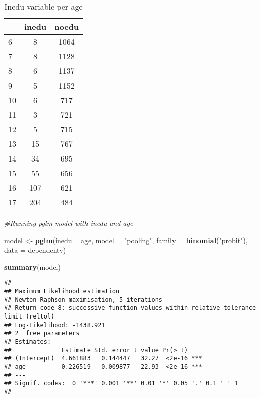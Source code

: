 \documentclass[
]{article}
\newenvironment{Shaded}{\begin{snugshade}}{\end{snugshade}}
\newcommand{\CommentTok}[1]{\textcolor[rgb]{0.56,0.35,0.01}{\textit{#1}}}
\newcommand{\DataTypeTok}[1]{\textcolor[rgb]{0.13,0.29,0.53}{#1}}
\newcommand{\KeywordTok}[1]{\textcolor[rgb]{0.13,0.29,0.53}{\textbf{#1}}}
\newcommand{\NormalTok}[1]{#1}
\newcommand{\OperatorTok}[1]{\textcolor[rgb]{0.81,0.36,0.00}{\textbf{#1}}}
\newcommand{\StringTok}[1]{\textcolor[rgb]{0.31,0.60,0.02}{#1}}
\begin{document}
\begin{table}

\caption{\label{tab:unnamed-chunk-9}Inedu variable per age}
\centering
\begin{tabular}[t]{l|c|c}
\hline
  & inedu & noedu\\
\hline
6 & 8 & 1064\\
\hline
7 & 8 & 1128\\
\hline
8 & 6 & 1137\\
\hline
9 & 5 & 1152\\
\hline
10 & 6 & 717\\
\hline
11 & 3 & 721\\
\hline
12 & 5 & 715\\
\hline
13 & 15 & 767\\
\hline
14 & 34 & 695\\
\hline
15 & 55 & 656\\
\hline
16 & 107 & 621\\
\hline
17 & 204 & 484\\
\hline
\end{tabular}
\end{table}

\begin{Shaded}
\begin{Highlighting}[]
\CommentTok{#Running pglm model with inedu and age }


\NormalTok{model <-}\StringTok{ }\KeywordTok{pglm}\NormalTok{(inedu }\OperatorTok{~}\StringTok{ }\NormalTok{age, }\DataTypeTok{model =} \StringTok{"pooling"}\NormalTok{, }\DataTypeTok{family =} \KeywordTok{binomial}\NormalTok{(}\StringTok{"probit"}\NormalTok{), }\DataTypeTok{data =}\NormalTok{ dependentv)}

\KeywordTok{summary}\NormalTok{(model)}
\end{Highlighting}
\end{Shaded}

\begin{verbatim}
## --------------------------------------------
## Maximum Likelihood estimation
## Newton-Raphson maximisation, 5 iterations
## Return code 8: successive function values within relative tolerance limit (reltol)
## Log-Likelihood: -1438.921 
## 2  free parameters
## Estimates:
##              Estimate Std. error t value Pr(> t)    
## (Intercept)  4.661883   0.144447   32.27  <2e-16 ***
## age         -0.226519   0.009877  -22.93  <2e-16 ***
## ---
## Signif. codes:  0 '***' 0.001 '**' 0.01 '*' 0.05 '.' 0.1 ' ' 1
## --------------------------------------------
\end{verbatim}
\end{document}
